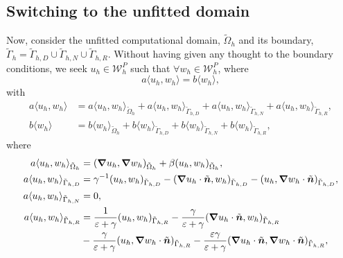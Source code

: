\documentclass{article}
\begin{document}
\subsection{Switching to the unfitted domain}
Now, consider the unfitted computational domain, $\tilde{\Omega}_h$ and its boundary, $\tilde{\Gamma}_h = \tilde{\Gamma}_{h,D} \cup \tilde{\Gamma}_{h,N} \cup \tilde{\Gamma}_{h,R}$. Without having given any thought to the boundary conditions, we seek $u_h \in \mathcal{W}^P_h$ such that $\forall w_h \in\mathcal{W}^P_h$, where
\begin{equation}\label{eq:generalized_form}
    a \langle u_h,w_h \rangle = b\langle w_h \rangle,
\end{equation}
with
\begin{subequations}
\begin{align}
     a \langle u_h,w_h \rangle &= a\langle u_h,w_h \rangle_{\tilde{\Omega}_h} + a\langle u_h,w_h \rangle_{\tilde{\Gamma}_{h,D}} + a \langle u_h,w_h \rangle_{\tilde{\Gamma}_{h,N}} + a \langle u_h,w_h \rangle_{\tilde{\Gamma}_{h,R}}, \\
     b\langle w_h \rangle &= b\langle w_h \rangle_{\tilde{\Omega}_h} + b\langle w_h \rangle_{\tilde{\Gamma}_{h,D}} + b \langle w_h \rangle_{\tilde{\Gamma}_{h,N}} + b\langle w_h \rangle_{\tilde{\Gamma}_{h,R}},
\end{align}
\end{subequations}
where
\begin{subequations}\label{eq:unfitted_bilinear_form}
\begin{align}
    a\langle u_h,w_h \rangle_{\tilde{\Omega}_h} &= (\boldsymbol{\nabla} u_h, \boldsymbol{\nabla} w_h)_{\tilde{\Omega}_h} + \beta  ( u_h,  w_h)_{\tilde{\Omega}_h},  \\
    a\langle u_h,w_h \rangle_{\tilde{\Gamma}_{h,D}} &= \gamma^{-1} (u_h,w_h)_{\tilde{\Gamma}_{h,D}} - (\boldsymbol{\nabla} u_h \cdot \tilde{\boldsymbol{n}},w_h)_{\tilde{\Gamma}_{h,D}} -(u_h,\boldsymbol{\nabla} w_h \cdot \tilde{\boldsymbol{n}})_{\tilde{\Gamma}_{h,D}},  \\
    a \langle u_h,w_h \rangle_{\tilde{\Gamma}_{h,N}} &= 0, \\
    a \langle u_h,w_h \rangle_{\tilde{\Gamma}_{h,R}} &= \frac{1}{\varepsilon + \gamma} (u_h,w_h)_{\tilde{\Gamma}_{h,R}} 
    - \frac{\gamma}{\varepsilon + \gamma} (\boldsymbol{\nabla} u_h \cdot \tilde{\boldsymbol{n}},w_h)_{\tilde{\Gamma}_{h,R}} \notag \\
    & - \frac{\gamma}{\varepsilon + \gamma} (u_h,\boldsymbol{\nabla} w_h \cdot \tilde{\boldsymbol{n}})_{\tilde{\Gamma}_{h,R}}
    - \frac{\varepsilon\gamma}{\varepsilon + \gamma} (\boldsymbol{\nabla} u_h \cdot \tilde{\boldsymbol{n}},\boldsymbol{\nabla} w_h \cdot \tilde{\boldsymbol{n}})_{\tilde{\Gamma}_{h,R}} ,   
\end{align}
\end{subequations}
\end{document}
